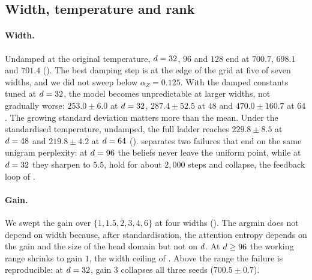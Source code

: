 \begin{table}[t]
\centering\footnotesize

\caption{Pairwise exponents, each pair fitted on the range both curves share: number of frontier
points, exponent, and its range when any one point is left out. Where the two leave-one-out
ranges in a row do not overlap, no single point decides the ordering. Two rows rest on three
points a side, the minimum for a fit and too few to leave one out.}
\label{tab:exponents-full}
\end{table}

\subsection{Width, temperature and rank}
\label{app:grid-gain}
\label{app:grid-lr}
\label{app:grid-rank}

\paragraph{Width.}
Undamped at the original temperature, $d=32$, $96$ and $128$ end at $700.7$, $698.1$ and
$701.4$ (). The best damping step is at the edge of the grid at five of
seven widths, and we did not sweep below $\alpha_Z=0.125$. With the damped constants tuned at
$d=32$, the model becomes unpredictable at larger widths, not gradually worse: $253.0\pm6.0$
at $d=32$, $287.4\pm52.5$ at $48$ and $470.0\pm160.7$ at $64$. The growing standard
deviation matters more than the mean. Under the standardised temperature, undamped, the full
ladder reaches $229.8\pm8.5$ at $d=48$ and $219.8\pm4.2$ at $d=64$
().  separates two failures that end on the same unigram perplexity: at $d=96$ the beliefs never leave the uniform point, while at $d=32$ they sharpen to $5.5$,
hold for about $2{,}000$ steps and collapse, the feedback loop of .

\paragraph{Gain.}
We swept the gain over $\{1, 1.5, 2, 3, 4, 6\}$ at four widths (). The argmin
does not depend on width because, after standardisation, the attention entropy depends on the
gain and the size of the head domain but not on $d$. At $d\ge96$ the working range
shrinks to gain $1$, the width ceiling of . Above the range the
failure is reproducible: at $d=32$, gain $3$ collapses all three seeds ($700.5\pm0.7$).

